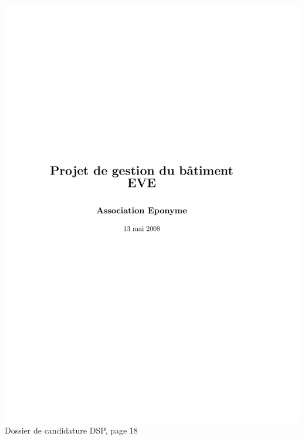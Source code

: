\includegraphics[scale=0.85,trim=20mm 20mm 20mm 20mm,clip,page=18]{annexes/candidature_dsp.pdf} \\
Dossier de candidature DSP, page 18
\newpage
